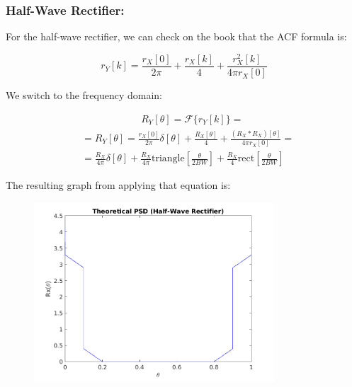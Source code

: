 \documentclass[a4paper,11pt]{article}
\begin{document}
\newpage

\subsubsection{Half-Wave Rectifier:}

For the half-wave rectifier, we can check on the book that the ACF formula is:

\begin{equation}\label{eq:r_hw}
  r_Y[k] = \frac{r_X[0]}{2\pi}
  +\frac{r_X[k]}{4}+\frac{r_X^2[k]}{4\pi r_X[0]}
\end{equation}

We switch to the frequency domain:

\begin{equation}\label{eq:R_hw}
  \begin{split}
  & \qquad\qquad\qquad R_Y[\theta] = \mathcal{F}\{r_Y[k]\} = \\
  & = R_Y[\theta] = \displaystyle\frac{r_X[0]}{2\pi}\delta[\theta] +
  \displaystyle\frac{R_X[\theta]}{4} +
  \frac{(R_X\ast R_X)[\theta]}{4\pi r_X[0]} = \\
  & = \displaystyle\frac{R_X}{4\pi}\delta[\theta] +
  \displaystyle\frac{R_X}{4\pi} \text{triangle}[\frac{\theta}{2 BW}] +
  \frac{R_X}{4}\text{rect}[\frac{\theta}{2 BW}]
  \end{split}
\end{equation}

The resulting graph from applying that equation is:

\begin{figure}[!hp]
    \begin{center}
      \includegraphics[width=0.8\textwidth]{images/study3/R_th_hw.png}
    \end{center}
\end{figure}
\end{document}
